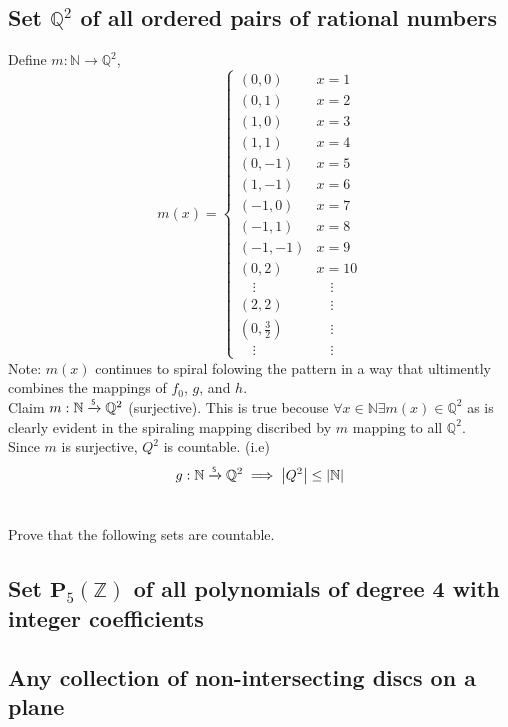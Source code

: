 \documentclass[]{article}
\newcommand{\N}{\mathbb{N}}
\newcommand{\Z}{\mathbb{Z}}
\newcommand{\Q}{\mathbb{Q}}
\newcommand{\toS}{\xrightarrow{\textsf{\tiny S}}}
\begin{document}
\subsection{Set $\Q^2$ of all ordered pairs of rational numbers}
Define $m : \N \to \Q^2$,
\begin{displaymath}
	m(x) = 
	\begin{cases}
		(0,0)	&x=1\\
		(0,1)	&x=2\\
		(1,0)	&x=3\\
		(1,1)	&x=4\\
		(0,-1)	&x=5\\
		(1,-1)	&x=6\\
		(-1,0)	&x=7\\
		(-1,1)	&x=8\\
		(-1,-1)	&x=9\\
		(0,2)	&x=10\\
		\quad \vdots &\quad \vdots\\
		(2,2)	&\quad \vdots\\
		(0,\frac{3}{2}) &\quad \vdots\\
		\quad \vdots	&\quad \vdots
	\end{cases}
\end{displaymath}
Note: $m(x)$ continues to spiral folowing the pattern in a way that ultimently
combines the mappings of $f_0$, $g$, and $h$.\\

Claim $m : \N \toS \Q^2$ (surjective).
This is true becouse $\forall x \in \N \exists m(x) \in \Q^2$ as is 
clearly evident in the spiraling mapping discribed by $m$ mapping to all $\Q^2$.\\

Since $m$ is surjective, $Q^2$ is countable. (i.e)
$$g : \N \toS \Q^2 \implies \abs{Q^2} \leq \abs{\N}$$


\newpage
\section{}
Prove that the following sets are countable.

\subsection{Set $\mathbf{P}_5(\Z)$ of all polynomials of degree 4 with integer coefficients}


\subsection{Any collection of non-intersecting discs on a plane}
\end{document}
